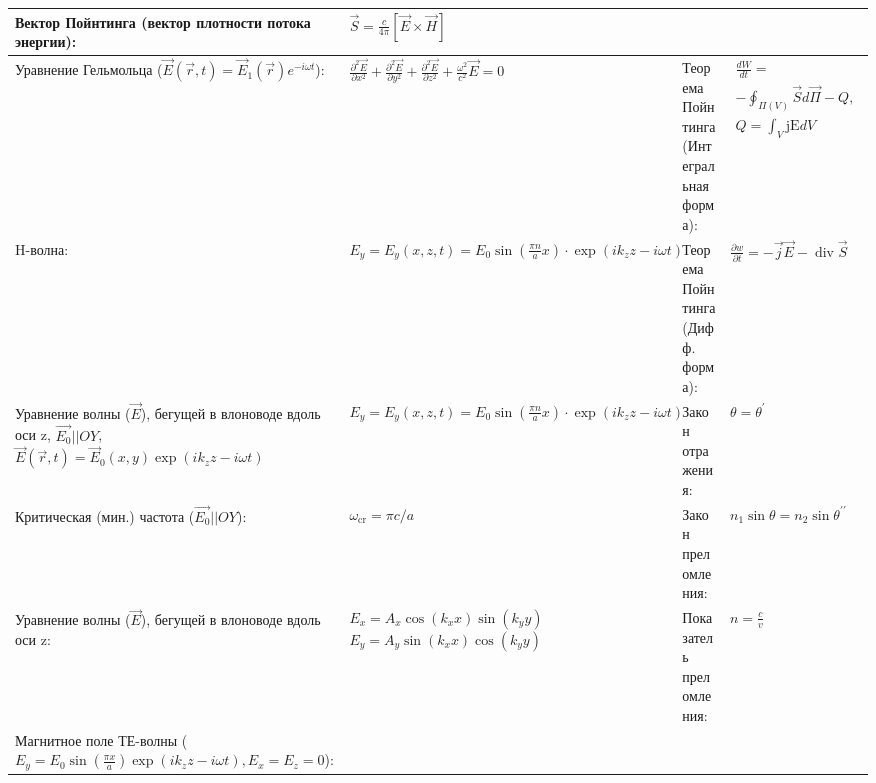 \documentclass{article}
\begin{document}
\begin{tabular}{ |p{5cm}|p{4.5cm}|p{6cm}|p{3.5cm}|  }
Вектор Пойнтинга (вектор плотности потока энергии):                        &
$\vec{S}=\frac{c}{4 \pi} [\vec{E} \times \vec{H}]$                         \\
\hline
Уравнение Гельмольца ($\vec{E}(\vec{r}, t)=\vec{E}_{1}(\vec{r}) e^{-i \omega t}$):&
$\frac{\partial^{2} \vec{E}}{\partial x^{2}}+\frac{\partial^{2} \vec{E}}{\partial y^{2}}+\frac{\partial^{2} \vec{E}}{\partial z^{2}}+\frac{\omega^{2}}{c^{2}} \vec{E}=0$&
Теорема Пойнтинга (Интегральная форма):                                    &
$\begin{aligned}
\frac{d W}{d t}=                        \\
-\oint_{\Pi(V)} \vec{S} d \vec{\Pi}-Q,  \\
Q=\int_{V} \mathrm{jE} d V
\end{aligned}$                                                             \\
\hline
H-волна:                                                                   &
$E_{y}=E_{y}(x, z, t)=E_{0} \sin \left(\frac{\pi n}{a} x\right) \cdot \exp \left(i k_{z} z-i \omega t\right)$&
Теорема Пойнтинга (Дифф. форма):                                           &
$\frac{\partial w}{\partial t} = - \vec{j} \vec{E}-\operatorname{div} \vec{S}$\\
\hline
Уравнение волны ($\vec{E}$), бегущей в влоноводе вдоль оси z, $\vec{E_0} || OY$,
$\vec{E}(\vec{r}, t)=\vec{E}_{0}(x, y) \exp \left(i k_{z} z-i \omega t\right)$&
$E_{y}=E_{y}(x, z, t)=E_{0} \sin \left(\frac{\pi n}{a} x\right) \cdot \exp \left(i k_{z} z-i \omega t\right)$&
Закон отражения:                                                           &
$\theta=\theta^{\prime}$                                                   \\
\hline
Критическая (мин.) частота ($\vec{E_0} || OY$):                            &
$\omega_{\mathrm{cr}}=\pi c / a$                                           &
Закон преломления:                                                         &
$n_{1} \sin \theta=n_{2} \sin \theta^{\prime \prime}$                      \\
\hline
Уравнение волны ($\vec{E}$), бегущей в влоноводе вдоль оси z:              &
$E_{x}=A_{x} \cos \left(k_{x} x\right) \sin \left(k_{y} y\right)$
$E_{y}=A_{y} \sin \left(k_{x} x\right) \cos \left(k_{y} y\right)$          &
Показатель преломления:                                                    &
$n=\frac{c}{v}$                                                            \\
\hline
Магнитное поле ТЕ-волны ($E_{y}=E_{0} \sin \left(\frac{\pi x}{a}\right) \exp \left(i k_{z} z-i \omega t\right), E_{x}=E_{z}=0$):&

\end{tabular}
\end{document}
